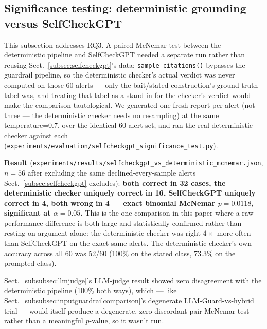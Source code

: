 \documentclass[pdflatex,sn-mathphys-num]{sn-jnl}%
\begin{document}
\subsection{Significance testing: deterministic grounding versus SelfCheckGPT}\label{subsec:mcnemar}

This subsection addresses RQ3. A paired McNemar test between the deterministic pipeline and
SelfCheckGPT needed a separate run rather than reusing
Sect.~\ref{subsec:selfcheckgpt}'s data: \texttt{sample\_citations()}
bypasses the guardrail pipeline, so the deterministic checker's actual
verdict was never computed on those 60 alerts --- only the bait/stated
construction's ground-truth label was, and treating that label as a
stand-in for the checker's verdict would make the comparison
tautological. We generated one fresh report per alert (not three --- the
deterministic checker needs no resampling) at the same temperature=0.7,
over the identical 60-alert set, and ran the real deterministic checker
against each
(\texttt{experiments/evaluation/selfcheckgpt\_significance\_test.py}).

\textbf{Result} (\texttt{experiments/results/selfcheckgpt\_vs\_deterministic\_mcnemar.json},
$n=56$ after excluding the same declined-every-sample alerts
Sect.~\ref{subsec:selfcheckgpt} excludes): \textbf{both correct in 32
cases, the deterministic checker uniquely correct in 16, SelfCheckGPT
uniquely correct in 4, both wrong in 4 --- exact binomial McNemar
$p=0.0118$, significant at $\alpha=0.05$.} This is the one comparison in
this paper where a raw performance difference is both large and
statistically confirmed rather than resting on argument alone: the
deterministic checker was right $4\times$ more often than SelfCheckGPT
on the exact same alerts. The deterministic checker's own accuracy
across all 60 was 52/60 (100\% on the stated class, 73.3\% on the
prompted class).

Sect.~\ref{subsubsec:llmjudge}'s LLM-judge result showed zero
disagreement with the deterministic pipeline (100\% both ways), which ---
like Sect.~\ref{subsubsec:inputguardrailcomparison}'s degenerate
LLM-Guard-vs-hybrid trial --- would itself produce a degenerate,
zero-discordant-pair McNemar test rather than a meaningful $p$-value, so
it wasn't run.
\end{document}
